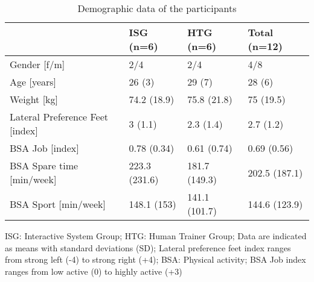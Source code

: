\begin{table}[]
\centering
  \begin{threeparttable}
\caption{Demographic data of the participants}
\label{tab:6_2_demographic}
\begin{tabular}{@{}llll@{}}
\toprule
                                & ISG (n=6)     & HTG (n=6)     & Total (n=12)  \\ \midrule
Gender [f/m]                    & 2/4           & 2/4           & 4/8           \\
Age [years]                     & 26 (3)        & 29 (7)        & 28 (6)        \\
Weight [kg]                     & 74.2 (18.9)   & 75.8 (21.8)   & 75 (19.5)     \\
Lateral Preference Feet [index] & 3 (1.1)       & 2.3 (1.4)     & 2.7 (1.2)     \\
BSA Job [index]                 & 0.78 (0.34)   & 0.61 (0.74)   & 0.69 (0.56)   \\
BSA Spare time [min/week]       & 223.3 (231.6) & 181.7 (149.3) & 202.5 (187.1) \\
BSA Sport [min/week]            & 148.1 (153)   & 141.1 (101.7) & 144.6 (123.9) \\ \bottomrule
\end{tabular}
    \begin{tablenotes}
      \small
      \item ISG: Interactive System Group; HTG: Human Trainer Group; Data are indicated as means with standard deviations (SD); Lateral preference feet index ranges from strong left (-4) to strong right (+4); BSA: Physical activity; BSA Job index ranges from low active (0) to highly active (+3)
    \end{tablenotes}
  \end{threeparttable}
\end{table}
